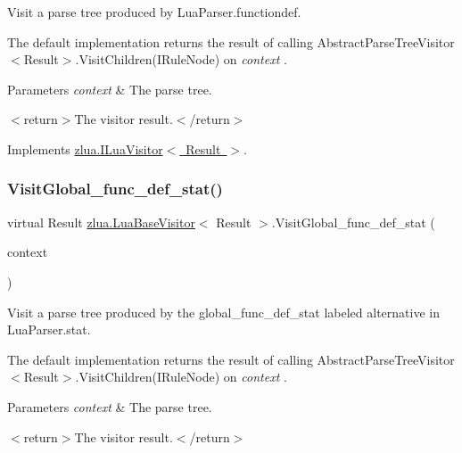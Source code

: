 Visit a parse tree produced by Lua\+Parser.\+functiondef. 

The default implementation returns the result of calling Abstract\+Parse\+Tree\+Visitor$<$\+Result$>$.\+Visit\+Children(\+I\+Rule\+Node) on {\itshape context} . 


\begin{DoxyParams}{Parameters}
{\em context} & The parse tree.\\
\hline
\end{DoxyParams}
$<$return$>$The visitor result.$<$/return$>$ 

Implements \mbox{\hyperlink{interfacezlua_1_1_i_lua_visitor_aa4ae9c9b23327ffa825c98325c4a228e}{zlua.\+I\+Lua\+Visitor$<$ Result $>$}}.

\mbox{\label{classzlua_1_1_lua_base_visitor_a24c128425bc45cc59eea8e463fead320}} 
\subsubsection{\texorpdfstring{Visit\+Global\+\_\+func\+\_\+def\+\_\+stat()}{VisitGlobal\_func\_def\_stat()}}
{\footnotesize\ttfamily virtual Result \mbox{\hyperlink{classzlua_1_1_lua_base_visitor}{zlua.\+Lua\+Base\+Visitor}}$<$ Result $>$.Visit\+Global\+\_\+func\+\_\+def\+\_\+stat (\begin{DoxyParamCaption}\item[{\mbox{[}\+Not\+Null\mbox{]} \mbox{\hyperlink{classzlua_1_1_lua_parser_1_1_global__func__def__stat_context}{Lua\+Parser.\+Global\+\_\+func\+\_\+def\+\_\+stat\+Context}}}]{context }\end{DoxyParamCaption})\hspace{0.3cm}{\ttfamily [virtual]}}



Visit a parse tree produced by the {\ttfamily global\+\_\+func\+\_\+def\+\_\+stat} labeled alternative in Lua\+Parser.\+stat. 

The default implementation returns the result of calling Abstract\+Parse\+Tree\+Visitor$<$\+Result$>$.\+Visit\+Children(\+I\+Rule\+Node) on {\itshape context} . 


\begin{DoxyParams}{Parameters}
{\em context} & The parse tree.\\
\hline
\end{DoxyParams}
$<$return$>$The visitor result.$<$/return$>$ 

